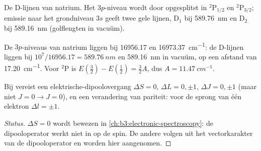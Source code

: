 \begin{omfigure}

{\small De D-lijnen van natrium. Het $3p$-niveau wordt door
 opgesplitst
in ${}^2$P$_{1/2}$ en ${}^2$P$_{3/2}$; emissie naar het grondniveau $3s$
geeft twee gele lijnen, D$_1$ bij \qty{589.76}{nm} en D$_2$ bij
\qty{589.16}{nm} (golflengten in vacuüm).}
\end{omfigure}

\begin{example}\label{ex:b3:many-electron-atoms:sodium}
De $3p$-niveaus van natrium liggen bij 16956.17 en \qty{16973.37}{cm^{-1}}: de
D-lijnen liggen bij $10^7/16956.17 = \qty{589.76}{nm}$ en \qty{589.16}{nm} in
vacuüm, op een afstand van \qty{17.20}{cm^{-1}}. Voor ${}^2$P is $E(\frac32) - E(\frac12) =
\frac32A$, dus $A = \qty{11.47}{cm^{-1}}$.
\end{example}

\begin{proposition}\label{prop:b3:many-electron-atoms:selection-atoms}
Bij  vereist een elektrische-dipoolovergang
$\Delta S = 0$, $\Delta L = 0, \pm1$, $\Delta J = 0, \pm1$ (maar niet $J = 0 \to J
= 0$), en een verandering van pariteit: voor de sprong van één elektron $\Delta l = \pm1$.
\end{proposition}
\begin{proof}[Status]
$\Delta S = 0$ wordt bewezen in \cref{ch:b3:electronic-spectroscopy}: de
dipooloperator werkt niet in op de spin. De andere volgen uit het
vectorkarakter van de dipooloperator en worden hier aangenomen.
\end{proof}

